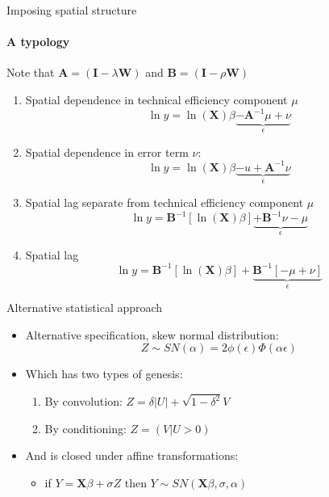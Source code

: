 \documentclass[presentation]{beamer}
\begin{document}
\begin{frame}{Imposing spatial structure}
\framesubtitle{A typology}
Note that $\mathbf{A} = \left(\mathbf{I} - \lambda\mathbf{W}\right)$ and $\mathbf{B} = \left(\mathbf{I} - \rho\mathbf{W}\right)$
	\begin{enumerate}
		\item Spatial dependence in technical efficiency component $\mu$
		\begin{equation*}
			\ln y = \ln(\mathbf{X}) \beta \underbrace{- \mathbf{A}^{-1}\mu + \nu}_\epsilon
		\end{equation*}
		\item Spatial dependence in error term $\nu$:
		\begin{equation*}
			\ln y = \ln(\mathbf{X}) \beta \underbrace{- u +  \mathbf{A}^{-1}\nu}_\epsilon
		\end{equation*}
		\item Spatial lag separate from technical efficiency component $\mu$
		\begin{equation*}
			\ln y =  \mathbf{B}^{-1}\left[\ln(\mathbf{X}) \beta\right] \underbrace{+ \mathbf{B}^{-1}\nu - \mu}_{\epsilon}
		\end{equation*}
		\item Spatial lag
		\begin{equation*}
			\ln y = \mathbf{B}^{-1}\left[\ln(\mathbf{X}) \beta \right]+  \underbrace{\mathbf{B}^{-1}\left[- \mu + \nu\right]}_\epsilon
		\end{equation*}
	\end{enumerate}
\end{frame}

\begin{frame}{Alternative statistical approach}
	\begin{itemize}
		\item Alternative specification, skew normal distribution:
		\begin{equation*}
		Z \sim SN(\alpha) = 2\phi(\epsilon)\Phi(\alpha \epsilon)
		\end{equation*}
		\pause
		\item Which has two types of genesis:
		\begin{enumerate}
			\item By convolution: $Z = \delta|U| + \sqrt{1-\delta^2}V$
			\item By conditioning: $Z = (V|U>0)$
			\newline
		\end{enumerate}
		\pause
		\item And is closed under affine transformations:
		\begin{itemize}
			\item if $Y = \mathbf{X}\beta + \sigma Z$ then $Y \sim SN(\mathbf{X}\beta,\sigma, \alpha)$
		\end{itemize}
	\end{itemize}
\end{frame}
\end{document}
